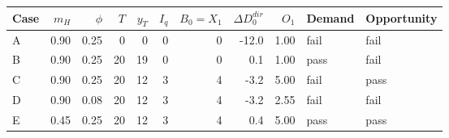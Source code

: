 \begin{tabular}{@{}lrrrrrrrrll@{}}
\toprule
Case & $m_H$ & $\phi$ & $T$ & $y_T$ & $I_q$ & $B_0=X_1$ & $\Delta D_0^{dir}$ & $O_1$ & Demand & Opportunity \\
\midrule
A & 0.90 & 0.25 & 0 & 0 & 0 & 0 & -12.0 & 1.00 & fail & fail \\
B & 0.90 & 0.25 & 20 & 19 & 0 & 0 & 0.1 & 1.00 & pass & fail \\
C & 0.90 & 0.25 & 20 & 12 & 3 & 4 & -3.2 & 5.00 & fail & pass \\
D & 0.90 & 0.08 & 20 & 12 & 3 & 4 & -3.2 & 2.55 & fail & fail \\
E & 0.45 & 0.25 & 20 & 12 & 3 & 4 & 0.4 & 5.00 & pass & pass \\
\bottomrule
\end{tabular}
